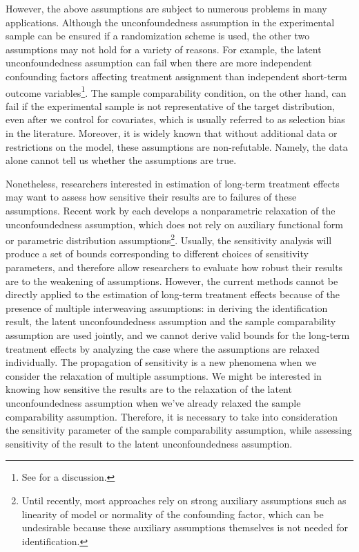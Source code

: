\documentclass[12pt]{article}
\begin{document}
	However, the above assumptions are subject to numerous problems in many applications. Although the unconfoundedness assumption in the experimental sample can be ensured if a randomization scheme is used, the other two assumptions may not hold for a variety of reasons. For example, the latent unconfoundedness assumption can fail when there are more independent confounding factors affecting treatment assignment than independent short-term outcome variables\footnote{See \textcite{athey2020combining} for a discussion.}. The sample comparability condition, on the other hand, can fail if the experimental sample is not representative of the target distribution, even after we control for covariates, which is usually referred to as selection bias in the literature. Moreover, it is widely known that without additional data or restrictions on the model, these assumptions are non-refutable. Namely, the data alone cannot tell us whether the assumptions are true. 
	
	Nonetheless, researchers interested in estimation of long-term treatment effects may want to assess how sensitive their results are to failures of these assumptions. Recent work by \textcite{masten2018identification, yadlowsky2018bounds, kallus2018confounding} each develops a nonparametric relaxation of the unconfoundedness assumption, which does not rely on auxiliary functional form or parametric distribution assumptions\footnote{Until recently, most approaches rely on strong auxiliary assumptions such as linearity of model or normality of the confounding factor, which can be undesirable because these auxiliary assumptions themselves is not needed for identification. }. Usually, the sensitivity analysis will produce a set of bounds corresponding to different choices of sensitivity parameters, and therefore allow researchers to evaluate how robust their results are to the weakening of assumptions. However, the current methods cannot be directly applied to the estimation of long-term treatment effects because of the presence of multiple interweaving assumptions: in deriving the identification result, the latent unconfoundedness assumption and the sample comparability assumption are used jointly, and we cannot derive valid bounds for the long-term treatment effects by analyzing the case where the assumptions are relaxed individually. The propagation of sensitivity is a new phenomena when we consider the relaxation of multiple assumptions. We might be interested in knowing how sensitive the results are to the relaxation of the latent unconfoundedness assumption when we've already relaxed the sample comparability assumption. Therefore, it is necessary to take into consideration the sensitivity parameter of the sample comparability assumption, while assessing sensitivity of the result to the latent unconfoundedness assumption. 
    
\end{document}
